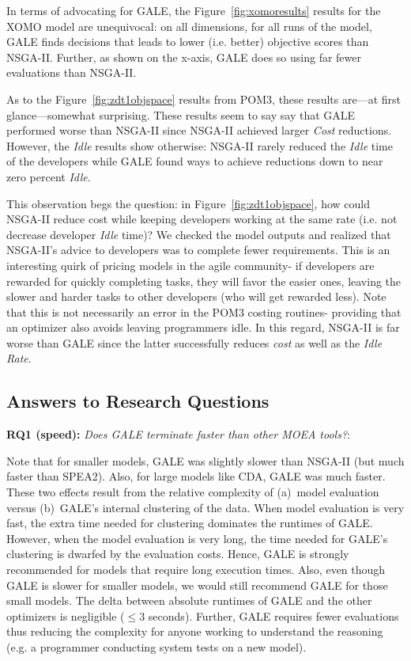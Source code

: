 \documentclass[10pt,journal,compsoc]{IEEEtran}
\newcommand{\fig}[1]{Figure~\ref{fig:#1}}
\newenvironment{changed}{\par\color{MyDarkBlue}}{\par}
\begin{document}
\begin{changed}
\noindent 
In terms of advocating for GALE,
the \fig{xomoresults} results for the XOMO model
are unequivocal: on all dimensions, for all runs of the model,
GALE finds decisions that leads to lower  (i.e.  better) objective scores than NSGA-II.
Further, as shown on the x-axis, GALE does so using far fewer evaluations than NSGA-II.
\end{changed}

As to the \fig{zdt1objspace} results from POM3, these results are---at first glance---somewhat surprising.
These results seem to say  say that GALE
performed worse than NSGA-II since NSGA-II achieved larger
{\em Cost} reductions. However, the {\em Idle}
results  show otherwise:
 NSGA-II rarely reduced
the {\em Idle} time of the developers  while GALE
found ways to achieve reductions down to near zero percent {\em Idle}.

This observation begs the question: in \fig{zdt1objspace},
how could NSGA-II reduce cost while keeping developers working at the same rate
(i.e. not decrease developer {\em
  Idle} time)?  We checked the model outputs
and realized that  NSGA-II's advice to developers was to
complete
fewer requirements. This is an interesting quirk of pricing models in the agile
community- if developers are rewarded for quickly completing tasks, they will
favor the easier ones, leaving the slower and harder tasks to other developers (who
will get rewarded less). 
Note that this is not necessarily an error in the  POM3 costing routines- providing 
that an optimizer also avoids leaving programmers idle.
In this regard, NSGA-II is far worse than GALE since the latter
successfully reduces {\em cost} as well as the {\em Idle Rate}.




\subsection{Answers to Research Questions}

{\bf RQ1 (speed):} {\em Does GALE terminate faster than other MOEA tools?}:

Note that 
for  smaller models, GALE was slightly slower than NSGA-II (but much faster than 
SPEA2). Also, for large models like CDA, GALE was much faster.
These two effects result from the relative complexity
of (a)~model evaluation versus (b)~GALE's internal clustering of the data.
When model evaluation is very fast, the extra time needed for clustering
dominates the runtimes of GALE.  However, when the
model evaluation is very long, the time
needed for GALE's clustering is dwarfed by the evaluation costs. Hence,
GALE is strongly recommended for models that require long execution times.
Also, even though GALE is slower for smaller models, we would still recommend GALE 
for those small models.
The delta between absolute runtimes of GALE and the other optimizers is negligible 
($\le 3$ seconds).
Further, GALE requires fewer evaluations thus reducing the complexity
for anyone working to understand the reasoning (e.g.  a
programmer conducting system tests on a new model).
\end{document}
